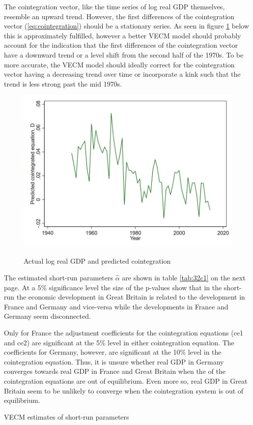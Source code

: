 The cointegration vector, like the time series of log real GDP themselves, resemble an upward trend. However, the first differences of the cointegration vector (\ref{eq:cointegration}) should be a stationary series. As seen in figure \ref{fig:32} below this is approximately fulfilled, however a better VECM model should probably account for the indication that the first differences of the cointegration vector have a downward trend or a level shift from the second half of the 1970s. To be more accurate, the VECM model should ideally correct for the cointegration vector having a decreasing trend over time or incorporate a kink such that the trend is less strong past the mid 1970s.
\begin{figure}[H]
  \caption{Actual log real GDP and predicted cointegration}
    \includegraphics[width= \textwidth]{03_figures/fig32}
  \label{fig:32}
  \vspace{-.5cm}
\end{figure}
The estimated short-run parameters $\hat{\alpha}$ are shown in table \ref{tab:32c1} on the next page. At a 5\% significance level the size of the p-values show that in the short-run the economic development in Great Britain is related to the development in France and Germany and vice-versa while the developments in France and Germany seem disconnected.

Only for France the adjustment coefficients for the cointegration equations (ce1 and ce2) are significant at the 5\% level in either cointegration equation. The coefficients for Germany, however, are significant at the 10\% level in the  cointegration equation. Thus, it is unsure whether real GDP in Germany converges towards real GDP in France and Great Britain when the  of the cointegration equations are out of equilibrium. Even more so, real GDP in Great Britain seem to be unlikely to converge when the cointegration system is out of equilibrium.
\begin{table}[H]
  \centering
  \footnotesize
  \caption{VECM estimates of short-run parameters}
    
  \label{tab:32c1}
\end{table}\noindent


